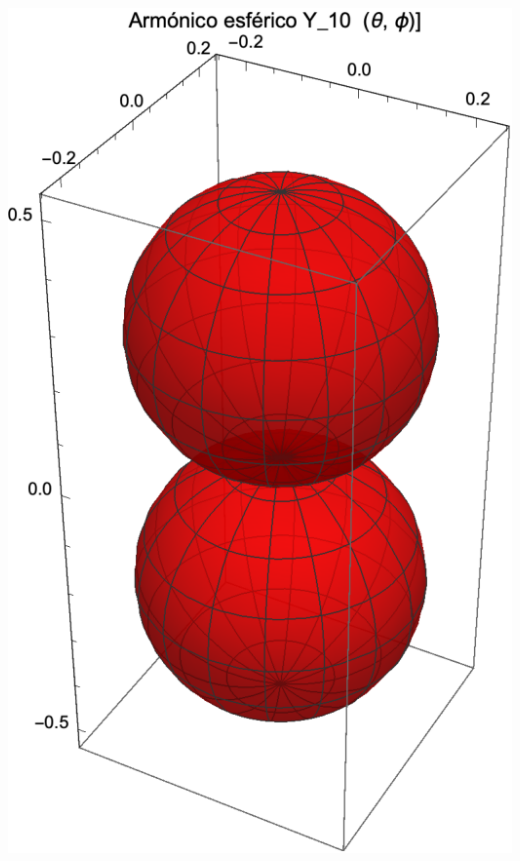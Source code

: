 \begin{minipage}{0.4\textwidth}
    \centering
    \includegraphics[scale=0.7]{Imagenes/Armonicos_Esfericos_10.eps}
\end{minipage}
\hspace{0.6cm}
